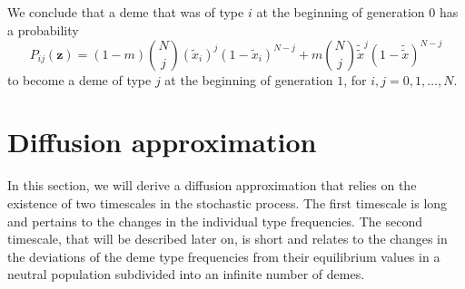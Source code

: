 \documentclass[11pt]{article}
\begin{document}
We conclude that a deme that was of type $i$ at the beginning of generation $0$ has a probability 
\begin{equation}\label{sec1-eq17}
P_{ij}(\mathbf{z})=(1-m)\binom{N}{j}\left(\tilde{x}_i\right)^j\left(1-\tilde{x}_i\right)^{N-j}+m\binom{N}{j}\tilde{\tilde{x}}^j\left(1-\tilde{\tilde{x}}\right)^{N-j}
\end{equation}
to become a deme of type $j$ at the beginning of generation $1$, for $i, j= 0, 1, \ldots, N$.





\section{Diffusion approximation}
In this section, we will derive a diffusion approximation that relies on the existence of two timescales in the stochastic process. The first timescale is long and pertains to the changes in the individual type frequencies. The second timescale, that will be described later on, is short and relates to the changes in the deviations of the deme type frequencies from their equilibrium values in a neutral population subdivided into an infinite number of demes.
\end{document}
